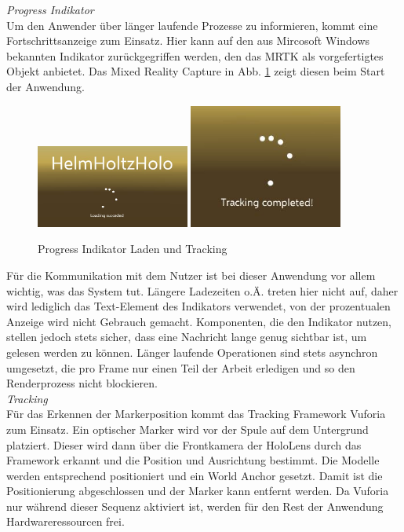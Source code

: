 \textit{Progress Indikator}\\
Um den Anwender über länger laufende Prozesse zu informieren, kommt eine Fortschrittsanzeige zum Einsatz. Hier kann auf den aus Mircosoft Windows bekannten Indikator zurückgegriffen werden, den das MRTK als vorgefertigtes Objekt anbietet. Das Mixed Reality Capture in Abb. \ref{img:pi-and-tracking} zeigt diesen beim Start der Anwendung.\\

\begin{figure}[H]
	\centering
	\includegraphics[width=0.45\textwidth]{images/loading.jpg}
	\hspace{0.05cm}	
	\includegraphics[width=0.45\textwidth]{images/tracking.jpg}
	\caption{Progress Indikator Laden und Tracking}
	\label{img:pi-and-tracking}
\end{figure}

Für die Kommunikation mit dem Nutzer ist bei dieser Anwendung vor allem wichtig, was das System tut. Längere Ladezeiten o.Ä. treten hier nicht auf, daher wird lediglich das Text-Element des Indikators verwendet, von der prozentualen Anzeige wird nicht Gebrauch gemacht. Komponenten, die den Indikator nutzen, stellen jedoch stets sicher, dass eine Nachricht lange genug sichtbar ist, um gelesen werden zu können. Länger laufende Operationen sind stets asynchron umgesetzt, die pro Frame nur einen Teil der Arbeit erledigen und so den Renderprozess nicht blockieren.\\

\textit{Tracking}\\
Für das Erkennen der Markerposition kommt das Tracking Framework Vuforia zum Einsatz. Ein optischer Marker wird vor der Spule auf dem Untergrund platziert. Dieser wird dann über die Frontkamera der HoloLens durch das Framework erkannt und die Position und Ausrichtung bestimmt. Die Modelle werden entsprechend positioniert und ein World Anchor gesetzt. Damit ist die Positionierung abgeschlossen und der Marker kann entfernt werden. Da Vuforia nur während dieser Sequenz aktiviert ist, werden für den Rest der Anwendung Hardwareressourcen frei.\\

